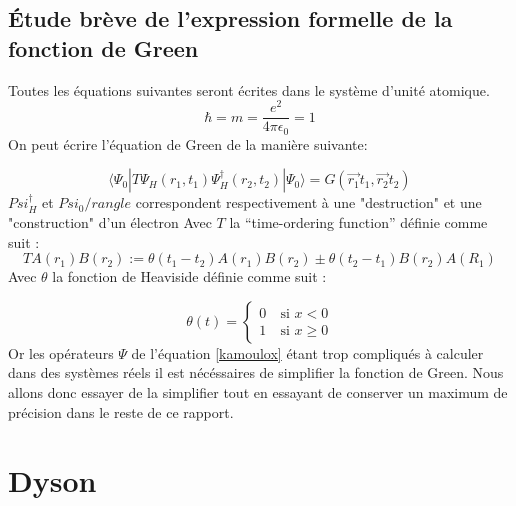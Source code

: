 \documentclass[12pt]{article}
\begin{document}
\subsection{\'Etude br\`eve de l'expression formelle de la fonction de Green}
Toutes les \'equations suivantes seront \'ecrites dans le syst\`eme d'unit\'e atomique.
\begin{equation}
 \hbar = m = \frac{e^2}{4 \pi \epsilon_0} = 1
\end{equation}
On peut \'ecrire l'\'equation de Green de la mani\`ere suivante:

\begin{equation}
\label{kamoulox}
 \langle \Psi_0 | T \Psi_H (r_1, t_1) \Psi_H^\dagger (r_2, t_2) | \Psi_0 \rangle = G(\vec{r_1} t_1, \vec{r_2}  t_2)
\end{equation}
$Psi_H^\dagger$ et $Psi_0/rangle$ correspondent respectivement à une "destruction" et une "construction" d'un \'electron
Avec $T$ la ``time-ordering function'' d\'efinie comme suit :
\begin{equation}
 T{A(r_1)B(r_2)} := \theta(t_1 - t_2)A(r_1)B(r_2) \pm \theta(t_2 - t_1)B(r_2) A(R_1)
\end{equation}
Avec $\theta$ la fonction de Heaviside d\'efinie comme suit :

\begin{equation}
\theta(t) = 
\left\{ \begin{array}{rl}
 0 &\ \text{si }x <0\\
 1 &\ \text{si }x \geq 0

\end{array} \right.
\end{equation}
Or les op\'erateurs $\Psi$ de l'\'equation \ref{kamoulox} \'etant trop compliqu\'es \`a calculer dans des syst\`emes r\'eels il est n\'ec\'essaires de simplifier la fonction de Green.
Nous allons donc essayer de la simplifier tout en essayant de conserver un maximum de pr\'ecision dans le reste de ce rapport.
\section{Dyson}
\end{document}
